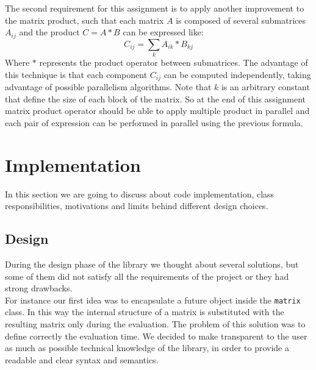 \documentclass[10pt,a4paper]{article}
\begin{document}
The second requirement for this assignment is to apply another improvement to the matrix product, such that each matrix $A$ is composed of several submatrices $A_{ij}$ and the product $C= A*B$ can be expressed like:
$$C_{ij} = \sum_k A_{ik}*B_{kj}$$
Where $*$ represents the product operator between submatrices. The advantage of this technique is that each component $C_{ij}$ can be computed independently, taking advantage of possible parallelism algorithms. Note that $k$ is an arbitrary constant that define the size of each block of the matrix.
So at the end of this assignment matrix product operator should be able to apply multiple product in parallel and each pair of expression can be performed in parallel using the previous formula.
\newpage
\section{Implementation}
In this section we are going to discuss about code implementation, class responsibilities, motivations and limits behind different design choices.

\subsection{Design}
During the design phase of the library we thought about several solutions, but some of them did not satisfy all the requirements of the project or they had strong drawbacks.\\
For instance our first idea was to encapsulate a future object inside the \verb|matrix| class. In this way the internal structure of a matrix is substituted with the resulting matrix only during the evaluation. The problem of this solution was to define correctly the evaluation time. We decided to make transparent to the user as much as possible technical knowledge of the library, in order to provide a readable and clear syntax and semantics. 
\end{document}
